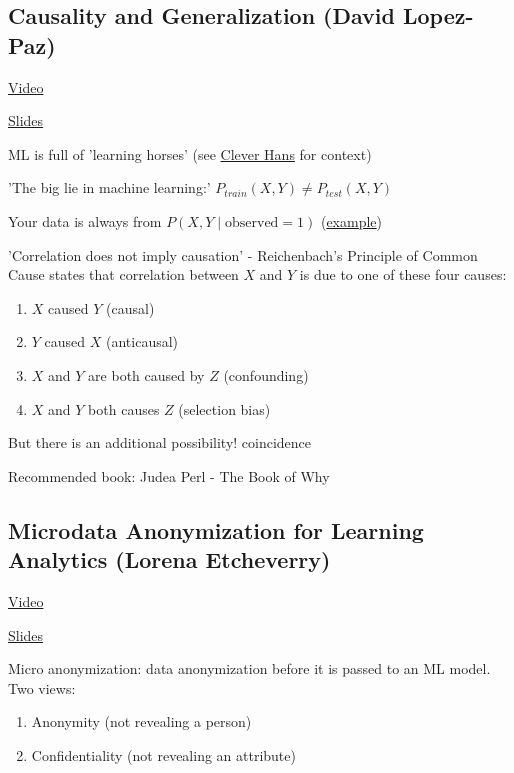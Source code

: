 \documentclass[12pt, english]{article}
\begin{document}
\subsection{Causality and Generalization (David Lopez-Paz)}
\href{http://tv.vera.com.uy/video/55354}{Video}

\href{https://drive.google.com/file/d/1IS26HUB20vDKuRGCUGGnukdMxqskRUJ9/view?usp=sharing}{Slides}

ML is full of 'learning horses' (see \href{https://en.wikipedia.org/wiki/Clever_Hans}{Clever Hans} for context)

'The big lie in machine learning:' $P_{train}(X,Y) \neq P_{test}(X,Y)$

Your data is always from $P(X, Y \mid \text{observed} = 1)$ (\href{https://en.wikipedia.org/wiki/Survivorship_bias#In_the_military}{example})

'Correlation does not imply causation'
- Reichenbach’s Principle of Common Cause states that correlation between $X$ and $Y$ is due to one of these four causes:

\begin{enumerate}
  \item $X$ caused $Y$ (causal)
  \item $Y$ caused $X$ (anticausal)
  \item $X$ and $Y$ are both caused by $Z$ (confounding)
  \item $X$ and $Y$ both causes $Z$ (selection bias)
\end{enumerate}
But there is an additional possibility! coincidence

Recommended book: Judea Perl - The Book of Why

\subsection{Microdata Anonymization for Learning Analytics (Lorena Etcheverry)}
\href{http://tv.vera.com.uy/video/55399}{Video}

\href{https://drive.google.com/file/d/1pY-gdaEq3wBmXNwS7b2EYJBENT7xAJRH/view?usp=sharing}{Slides}

Micro anonymization: data anonymization before it is passed to an ML model. Two views:
\begin{enumerate}
  \item Anonymity (not revealing a person)
  \item Confidentiality (not revealing an attribute)
\end{enumerate}
\end{document}
